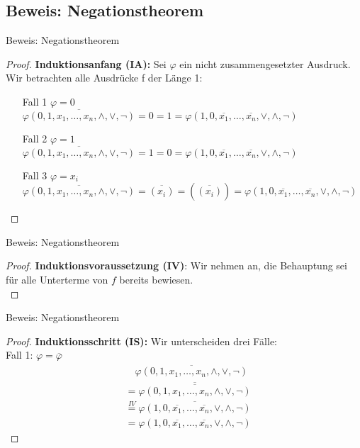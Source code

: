 \documentclass[12pt%
,aspectratio=169%
]{beamer}
\begin{document}
\subsection{Beweis: Negationstheorem}
\begin{frame}{Beweis: Negationstheorem}
\begin{proof}
\textbf{Induktionsanfang (IA):} Sei $\varphi$ ein nicht zusammengesetzter Ausdruck. Wir betrachten alle Ausdrücke f der Länge 1:
\begin{itemize}
	\item[Fall 1] $\varphi = 0$\\
	$\overline{\varphi(0, 1, x_1 , \ldots , x_n , \land, \lor, \neg)} = 0 = 1 = \varphi(1, 0, \overline{x_1} , \ldots ,\overline{x_n} , \lor, \land, \neg)$
	\item[Fall 2] $\varphi = 1$\\
	$\overline{\varphi(0, 1, x_1 , \ldots , x_n , \land, \lor, \neg)} = 1 = 0 = \varphi(1, 0, \overline{x_1} , \ldots ,\overline{x_n} , \lor, \land, \neg)$
	\item[Fall 3] $\varphi = x_i$\\
	$\overline{\varphi(0, 1, x_1 , \ldots , x_n , \land, \lor, \neg)} = \overline{(x_i)} = (\overline{(x_i)}) = \varphi(1, 0, \overline{x_1} , \ldots ,\overline{x_n} , \lor, \land, \neg)$
\end{itemize}
\end{proof}
\end{frame}

\begin{frame}{Beweis: Negationstheorem}
\begin{proof}
\textbf{Induktionsvoraussetzung (IV)}: Wir nehmen an, die Behauptung sei für
alle Unterterme von $f$ bereits bewiesen.\\
\end{proof}
\end{frame}

\begin{frame}{Beweis: Negationstheorem}
\begin{proof}
\textbf{Induktionsschritt (IS):} Wir unterscheiden drei Fälle:\\
Fall 1: $\varphi = \overline{\varphi}$
\begin{align*}
&\quad \overline{\varphi(0, 1, x_1 , \ldots , x_n , \land, \lor, \neg)}\\
&= \overline{\overline{\varphi(0, 1, x_1 , \ldots , x_n , \land, \lor, \neg)}}\\
&\overset{IV}= \overline{\varphi(1, 0, \overline{x_1} , \ldots ,\overline{x_n} , \lor, \land, \neg)}\\
&= \varphi(1, 0, \overline{x_1} , \ldots ,\overline{x_n} , \lor, \land, \neg)
\end{align*}
\end{proof}
\end{frame}
\end{document}
